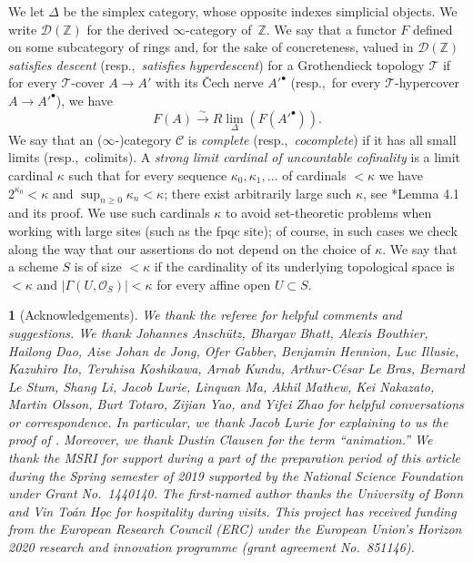 \documentclass[11pt, reqno]{amsart}
\newcommand{\bZ}{\mathbb{Z}}
\newcommand{\cD}{\mathcal{D}}
\newcommand{\sC}{\mathscr{C}}
\newcommand{\sO}{\mathscr{O}}
\newcommand{\sT}{\mathscr{T}}
\newcommand{\isomto}{\overset{\sim}{\longrightarrow}}
\newcommand{\ra}{\rightarrow}
\providecommand{\abs}[1]{\left\lvert#1\right\rvert}
\newcommand{\tst}{\textstyle}
\numberwithin{equation}{numberingbase}
\theoremstyle{thms}
\theoremstyle{claims}
\theoremstyle{defs}
\theoremstyle{thms}
\theoremstyle{defs}
\theoremstyle{subsection-tweak}
\theoremstyle{subsection-tweak}
\newtheorem*{pp-tweak}{}
\begin{document}
 We let $\Delta$ be the simplex category, whose opposite indexes simplicial objects. We write $\cD(\bZ)$ for the derived $\infty$-category of~$\bZ$.
 We say that a functor $F$ defined on some subcategory of rings and, for the sake of concreteness, valued in $\cD(\bZ)$ \emph{satisfies descent} (resp.,~\emph{satisfies hyperdescent}) for a Grothendieck topology $\sT$ if for every $\sT$-cover $A \ra A'$ with its \v{C}ech nerve $A'^\bullet$ (resp.,~for every $\sT$-hypercover $A \ra A'^\bullet$), we have 
\[
\tst F(A) \isomto R\lim_{\Delta} (F(A'^\bullet)).
\]
We say that an ($\infty$-)category $\sC$ is \emph{complete} (resp.,~\emph{cocomplete}) if it has all small limits (resp.,~colimits). A \emph{strong limit cardinal of uncountable cofinality} is a limit cardinal $\kappa$ such that for every sequence $\kappa_0, \kappa_1, \dotsc$ of cardinals $< \kappa$ we have $2^{\kappa_0} < \kappa$ and $\sup_{n \ge 0} \kappa_n < \kappa$; there exist arbitrarily large such $\kappa$, see \cite{Sch17}*{Lemma 4.1 and its proof}. We use such cardinals $\kappa$ to avoid set-theoretic problems when working with large sites (such as the fpqc site); of course, in such cases we check along the way that our assertions do not depend on the choice of  $\kappa$. We say that a scheme $S$ is of size $<\kappa$ if the cardinality of its underlying topological space is $< \kappa$ and $\abs{\Gamma(U, \sO_S)} < \kappa$ for every affine open $U \subset S$.




\begin{pp-tweak}[\!\!Acknowledgements]
We thank the referee for helpful comments and suggestions. We thank Johannes Ansch\"{u}tz, Bhargav Bhatt, Alexis Bouthier, Hailong Dao, Aise Johan de Jong, Ofer Gabber, Benjamin Hennion, Luc Illusie, Kazuhiro Ito, Teruhisa Koshikawa, Arnab Kundu, Arthur-C\'{e}sar Le Bras,  Bernard Le Stum, Shang Li, Jacob Lurie, Linquan Ma, Akhil Mathew, Kei Nakazato, Martin Olsson, Burt Totaro, Zijian Yao, and Yifei Zhao for helpful conversations or correspondence. In particular, we thank Jacob Lurie for explaining to us the proof of . Moreover, we thank Dustin Clausen for the term ``animation.'' We thank the MSRI for support during a part of the preparation period of this article during the Spring semester of 2019 supported by the National Science Foundation under Grant No.~1440140. The first-named author thanks the University of Bonn and Vin To\'{a}n H\d{o}c for hospitality during visits. This project has received funding from the European Research Council (ERC) under the European Union's Horizon 2020 research and innovation programme (grant agreement No.~851146).
\end{pp-tweak}
\end{document}
